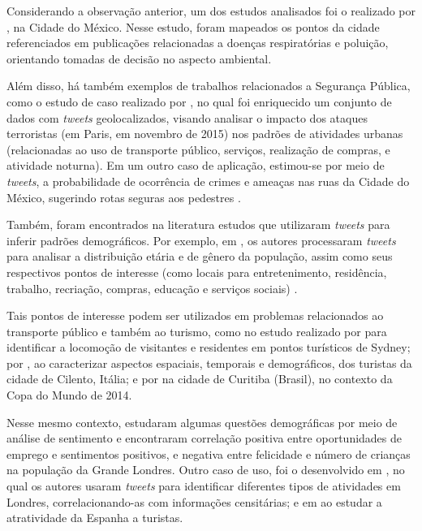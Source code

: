 \documentclass[
	12pt,				%
	oneside,			%
	a4paper,			%
	english,			%
	brazil				%
	]{abntex2ppgsi}
\begin{document}
{{{Considerando a observação anterior, um dos estudos analisados foi o realizado por \cite{Zagal2016}, na Cidade do México. Nesse estudo, foram mapeados os pontos da cidade referenciados em publicações relacionadas a doenças respiratórias e poluição, orientando tomadas de decisão no aspecto ambiental. 

Além disso, há também exemplos de trabalhos relacionados a Segurança Pública, como o estudo de caso realizado por \cite{Wen2016}, no qual foi enriquecido um conjunto de dados com \textit{tweets} geolocalizados, visando analisar o impacto dos ataques terroristas (em Paris, em novembro de 2015) nos padrões de atividades urbanas (relacionadas ao uso de transporte público, serviços, realização de compras, e atividade noturna). Em um outro caso de aplicação, estimou-se por meio de \textit{tweets}, a probabilidade de ocorrência de crimes e ameaças nas ruas da Cidade do México, sugerindo rotas seguras aos pedestres \cite{Mata2015}.

Também, foram encontrados na literatura estudos que utilizaram \textit{tweets} para inferir padrões demográficos. Por exemplo, em \cite{Farseev2015, Gkiotsalitis2015, Gkiotsalitis2016}, os autores processaram \textit{tweets} para analisar a distribuição etária e de gênero da população, assim como seus respectivos pontos de interesse (como locais para entretenimento, residência, trabalho, recriação, compras, educação e serviços sociais) \cite{Hasan2014, Maghrebi2015}. 

Tais pontos de interesse podem ser utilizados em problemas relacionados ao transporte público \cite{Gutev2016} e também ao turismo, como no estudo realizado por \cite{Abbasi2015} para identificar a locomoção de visitantes e residentes em pontos turísticos de Sydney; por \cite{Chua2016}, ao caracterizar aspectos espaciais, temporais e demográficos, dos turistas da cidade de Cilento, Itália; e por \cite{Thomaz2016} na cidade de Curitiba (Brasil), no contexto da Copa do Mundo de 2014.

Nesse mesmo contexto, \cite{Guo2016} estudaram algumas questões demográficas por meio de análise de sentimento e encontraram correlação positiva entre oportunidades de emprego e sentimentos positivos, e negativa entre felicidade e número de crianças na população da Grande Londres. Outro caso de uso, foi o desenvolvido em \cite{Steiger2015Census}, no qual os autores usaram \textit{tweets} para identificar diferentes tipos de atividades em Londres, correlacionando-as com informações censitárias; e em \cite{Sobolevsky2015} ao estudar a atratividade da Espanha a turistas.

}}}
\end{document}
